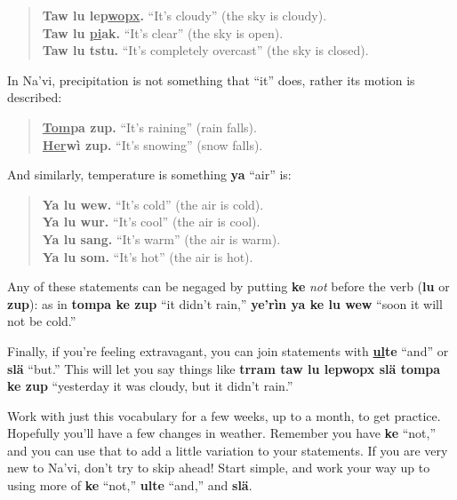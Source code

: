 \documentclass[nofonts]{tufte-handout}
\newcommand{\N}[1]{\textbf{\textcolor{navi}{#1}}}
\begin{document}
\begin{quotation}
\noindent\N{Taw lu lep\uline{wopx}.} ``It's cloudy'' (the sky is cloudy).\\
\noindent\N{Taw lu \uline{pi}ak.} ``It's clear'' (the sky is open). \\
\noindent\N{Taw lu tstu.} ``It's completely overcast'' (the sky is closed).
\end{quotation}

In Na'vi, precipitation is not something that ``it'' does, rather its
motion is described: 

\begin{quotation}
\noindent\N{\uline{Tom}pa zup.} ``It's raining'' (rain falls).\\
\noindent\N{\uline{Her}wì zup.} ``It's snowing'' (snow falls).
\end{quotation}

And similarly, temperature is something \N{ya} ``air'' is:

\begin{quotation}
\noindent\N{Ya lu wew.} ``It's cold'' (the air is cold). \\
\noindent\N{Ya lu wur.} ``It's cool'' (the air is cool). \\
\noindent\N{Ya lu sang.} ``It's warm'' (the air is warm). \\
\noindent\N{Ya lu som.} ``It's hot'' (the air is hot).
\end{quotation}

Any of these statements can be negaged by putting \N{ke} \textit{not}
before the verb (\N{lu} or \N{zup}): as in \N{tompa ke zup} ``it
didn't rain,'' \N{ye'rìn ya ke lu wew} ``soon it will not be cold.''

Finally, if you're feeling extravagant, you can join statements with
\N{\uline{ul}te} ``and'' or \N{slä} ``but.''  This will let you say
things like \N{trram taw lu lepwopx slä tompa ke zup} ``yesterday it
was cloudy, but it didn't rain.''

Work with just this vocabulary for a few weeks, up to a month, to get
practice.    Hopefully you'll have a few changes in
weather.  Remember you have \N{ke} ``not,'' and you can use that to
add a little variation to your statements.  If you are very new to
Na'vi, don't try to skip ahead!  Start simple, and work your way up to
using more of \N{ke} ``not,'' \N{ulte} ``and,'' and \N{slä}.
\end{document}
